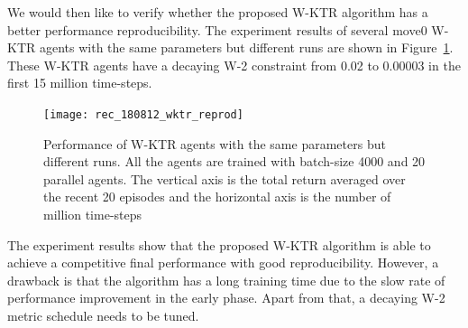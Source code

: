 %
We would then like to verify whether the proposed W-KTR algorithm has a better performance reproducibility. The experiment results of several move0 W-KTR agents with the same parameters but different runs are shown in Figure~\ref{fig_wltr_reprod}. These W-KTR agents have a decaying W-2 constraint from 0.02 to 0.00003 in the first 15 million time-steps.

\begin{figure}[!htbp]
	\texttt{[image: rec\_180812\_wktr\_reprod]}
	\centering
	\caption{Performance of W-KTR agents with the same parameters but different runs. All the agents are trained with batch-size 4000 and 20 parallel agents. The vertical axis is the total return averaged over the recent 20 episodes and the horizontal axis is the number of million time-steps}\label{fig_wltr_reprod}
\end{figure}
The experiment results show that the proposed W-KTR algorithm is able to achieve a competitive final performance with good reproducibility. However, a drawback is that the algorithm has a long training time due to the slow rate of performance improvement in the early phase. Apart from that, a decaying W-2 metric schedule needs to be tuned.

